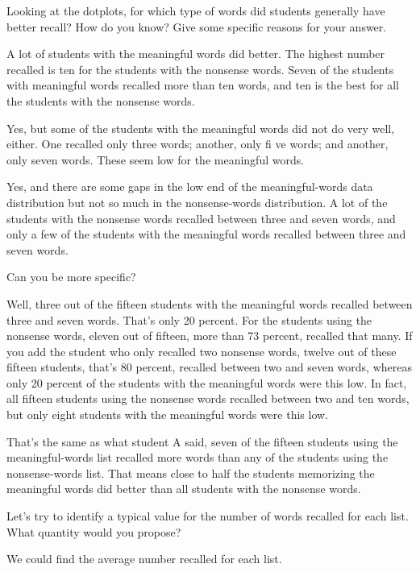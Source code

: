 \documentclass[
  10pt,
  a4paper,
  landscape,
  twoside,
  openany
]{scrbook}
\newlength{\scriptlabelwidth}
\newcommand{\scriptlabel}[1]{%
  \normalfont\slshape\makebox[\scriptlabelwidth][l]{#1}%
}
\newenvironment{scriptlist}{%
  \begin{list}{}{%
    \setlength{\labelwidth}{\scriptlabelwidth}%
    \setlength{\labelsep}{0.6em}%
    \setlength{\leftmargin}{\dimexpr\labelwidth+\labelsep\relax}%
    \setlength{\itemindent}{0pt}%
    \setlength{\listparindent}{0pt}%
    \setlength{\parsep}{0pt}%
    \setlength{\itemsep}{0.35\baselineskip}%
    \setlength{\topsep}{0.35\baselineskip}%
    \let\makelabel\scriptlabel
  }%
}{%
  \end{list}%
}
\begin{document}
{\begin{scriptlist}
  \item [Teacher:] Looking at the dotplots, for which type of words did students generally have better recall? How do you know? Give some specific reasons for your answer.
  \item [Student A:] A lot of students with the meaningful words did better. The highest number recalled is ten for the students with the nonsense words. Seven of the students with meaningful words recalled more than ten words, and ten is the best for all the students with the nonsense words.
  \item [Student B:] Yes, but some of the students with the meaningful words did not do very well, either. One recalled only three words; another, only fi ve words; and another, only seven words. These seem low for the meaningful words.
  \item [Student C:] Yes, and there are some gaps in the low end of the meaningful-words data distribution but not so much in the nonsense-words distribution. A lot of the students with the nonsense words recalled between three and seven words, and only a few of the students with the meaningful words recalled between three and seven words.
  \item [Teacher:] Can you be more specific?
  \item [Student C:] Well, three out of the fifteen students with the meaningful words recalled between three and seven words. That's only 20 percent. For the students using the nonsense words, eleven out of fifteen, more than 73 percent, recalled that many. If you add the student who only recalled two nonsense words, twelve out of these fifteen students, that's 80 percent, recalled between two and seven words, whereas only 20 percent of the students with the meaningful words were this low. In fact, all fifteen students using the nonsense words recalled between two and ten words, but only eight students with the meaningful words were this low. 
  \item [Teacher:] That's the same as what student A said, seven of the fifteen students using the meaningful-words list recalled more words than any of the students using the nonsense-words list. That means close to half the students memorizing the meaningful words did better than all students with the nonsense words.
  \item [Teacher:] Let's try to identify a typical value for the number of words recalled for each list. What quantity would you propose?
  \item [Student D:] We could find the average number recalled for each list.

\end{scriptlist}}
\end{document}

